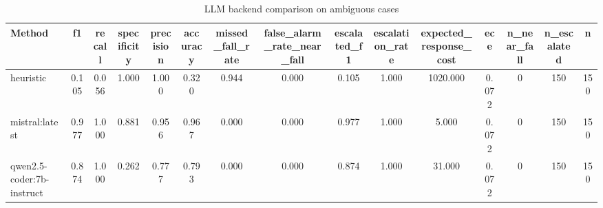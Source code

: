 \begin{table}[t]
\centering
\caption{LLM backend comparison on ambiguous cases}
\begin{tabular}{lcccccccccccccc}
\toprule
Method & f1 & recall & specificity & precision & accuracy & missed_fall_rate & false_alarm_rate_near_fall & escalated_f1 & escalation_rate & expected_response_cost & ece & n_near_fall & n_escalated & n \\
\midrule
heuristic & 0.105 & 0.056 & 1.000 & 1.000 & 0.320 & 0.944 & 0.000 & 0.105 & 1.000 & 1020.000 & 0.072 & 0 & 150 & 150 \\
mistral:latest & 0.977 & 1.000 & 0.881 & 0.956 & 0.967 & 0.000 & 0.000 & 0.977 & 1.000 & 5.000 & 0.072 & 0 & 150 & 150 \\
qwen2.5-coder:7b-instruct & 0.874 & 1.000 & 0.262 & 0.777 & 0.793 & 0.000 & 0.000 & 0.874 & 1.000 & 31.000 & 0.072 & 0 & 150 & 150 \\
\bottomrule
\end{tabular}
\end{table}